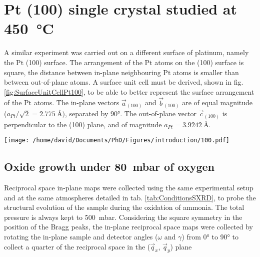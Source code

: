 \newpage
\section{Pt (100) single crystal studied at \qty{450}{\degreeCelsius}} \label{sec:SXRD100}


A similar experiment was carried out on a different surface of platinum, namely the Pt (100) surface.
The arrangement of the Pt atoms on the (100) surface is square, the distance between in-plane neighbouring Pt atoms is smaller than between out-of-plane atoms.
A surface unit cell must be derived, shown in fig. \ref{fig:SurfaceUnitCellPt100}, to be able to better represent the surface arrangement of the Pt atoms.
The in-plane vectors $\vec{a}_{(100)}$ and $\vec{b}_{(100)}$ are of equal magnitude ($a_{Pt} / \sqrt{2} = \qty{2.775}{\angstrom})$, separated by \ang{90}.
The out-of-plane vector $\vec{c}_{(100)}$ is perpendicular to the (100) plane, and of magnitude $a_{Pt} = \qty{3.9242}{\angstrom}$.

\begin{SCfigure}
    \centering
    \texttt{[image: /home/david/Documents/PhD/Figures/introduction/100.pdf]}
    \caption{
        Face-entered cubic unit cell of Pt with $(100)$ crystallographic plane drawn in green.
        $\vec{a}_{(100)}$, $\vec{b}_{(100)}$ and $\vec{c}_{(100)}$ are the $(100)$ surface unit cell vectors.
    }
    \label{fig:SurfaceUnitCellPt100}
\end{SCfigure}

\subsection{Oxide growth under \qty{80}{\milli\bar} of oxygen}

Reciprocal space in-plane maps were collected using the same experimental setup and at the same atmospheres detailed in tab. \ref{tab:ConditionsSXRD}, to probe the structural evolution of the sample during the oxidation of ammonia.
The total pressure is always kept to \qty{500}{\milli\bar}.
Considering the square symmetry in the position of the Bragg peaks, the in-plane reciprocal space maps were collected by rotating the in-plane sample and detector angles ($\omega$ and $\gamma$) from \ang{0} to \ang{90} to collect a quarter of the reciprocal space in the ($\vec{q}_x$, $\vec{q}_y$) plane

